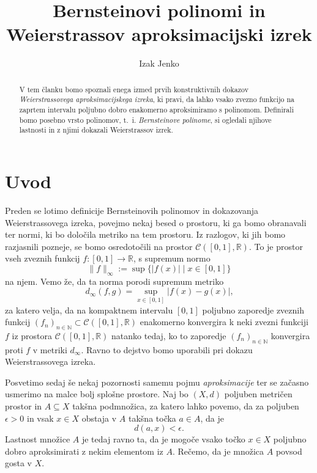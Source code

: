 \documentclass[a4paper, reqno]{amsart}
\theoremstyle{theorem}
\theoremstyle{definition}
\begin{document}
\title{Bernsteinovi polinomi in Weierstrassov aproksimacijski izrek}
\author{Izak Jenko}

\maketitle
\thispagestyle{empty}

\begin{abstract}
	V tem članku bomo spoznali enega izmed prvih konstruktivnih dokazov 
	\emph{Weierstrassovega aproksimacijskega izreka}, ki pravi, da lahko vsako zvezno 
	funkcijo na zaprtem intervalu poljubno dobro enakomerno aproksimiramo s polinomom. 
	Definirali bomo posebno vrsto polinomov, t.~i. \emph{Bernsteinove polinome}, si ogledali
	njihove lastnosti in z njimi dokazali Weierstrassov izrek.
\end{abstract}

\newcommand{\RR}{\mathbb{R}}
\newcommand{\NN}{\mathbb{N}}
\newcommand{\CIR}{\mathcal{C}([0,1],\RR)}
\newcommand{\dinf}{d_{\infty}}

\section{Uvod}

\par
Preden se lotimo definicije Bernsteinovih polinomov in dokazovanja Weierstrassovega
izreka, povejmo nekaj besed o prostoru, ki ga bomo obranavali ter normi, ki bo
določila metriko na tem prostoru. Iz razlogov, ki jih bomo razjasnili pozneje, se bomo
osredotočili na prostor $\mathcal{C}([0,1],\mathbb{R})$. To je prostor vseh zveznih
funkcij $f: [0,1] \to \RR$, s supremum normo
$$\|f\|_{\infty} := \sup \{|f(x)|\mid x \in [0,1]\}$$
na njem. Vemo že, da ta norma porodi supremum metriko
$$\dinf (f, g) = 
\sup_{x \in [0,1]} |f(x) - g(x)| \text{,}$$
za katero velja, da na kompaktnem intervalu $[0,1]$ poljubno zaporedje zveznih funkcij 
$(f_n)_{n \in \NN} \subset \CIR$ enakomerno konvergira k neki zvezni funkciji 
$f$ iz prostora $\CIR$
natanko tedaj, ko to zaporedje $(f_n)_{n \in \NN}$ konvergira proti $f$ v metriki $\dinf$.
Ravno to dejstvo bomo uporabili pri dokazu Weierstrassovega izreka. 
\par
Posvetimo sedaj še nekaj pozornosti samemu pojmu \emph{aproksimacije} ter se začasno usmerimo
na malce bolj splošne prostore. Naj bo $(X, d)$ poljuben metričen prostor in $A \subseteq X$
takšna podmnožica, za katero lahko povemo, da za poljuben $\epsilon > 0$ in vsak $x \in X$ 
obstaja v $A$ takšna točka $a \in A$, da je $$d(a, x) < \epsilon\text{.}$$ Lastnost množice
$A$ je tedaj ravno ta, da je mogoče vsako točko $x \in X$ poljubno dobro aproksimirati
z nekim elementom iz $A$. Rečemo, da je množica $A$ povsod gosta v $X$. 
\end{document}

